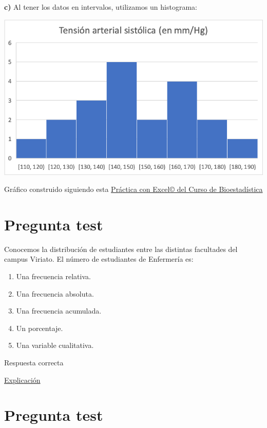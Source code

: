 \documentclass[
]{book}
\providecommand{\tightlist}{%
  \setlength{\itemsep}{0pt}\setlength{\parskip}{0pt}}
\begin{document}
\textbf{c)} Al tener los datos en intervalos, utilizamos un histograma:

\includegraphics[width=10.03in]{img/1_7}

Gráfico construido siguiendo esta \href{https://1fjmanzano.github.io/bioestadistica/histogramas.html\#histogramas-con-excel-pr\%C3\%A1cticas}{Práctica con Excel© del Curso de Bioestadística}

\hypertarget{pregunta-test-25}{%
\section{Pregunta test}\label{pregunta-test-25}}

Conocemos la distribución de estudiantes entre las distintas facultades del campus Viriato. El número de estudiantes de Enfermería es:

\begin{enumerate}
\def\labelenumi{\alph{enumi})}
\tightlist
\item
  Una frecuencia relativa.
\item
  Una frecuencia absoluta.
\item
  Una frecuencia acumulada.
\item
  Un porcentaje.
\item
  Una variable cualitativa.
\end{enumerate}

Respuesta correcta

\href{https://1fjmanzano.github.io/bioestadistica/tablas-de-frecuencias.html}{Explicación}

\hypertarget{pregunta-test-26}{%
\section{Pregunta test}\label{pregunta-test-26}}
\end{document}
